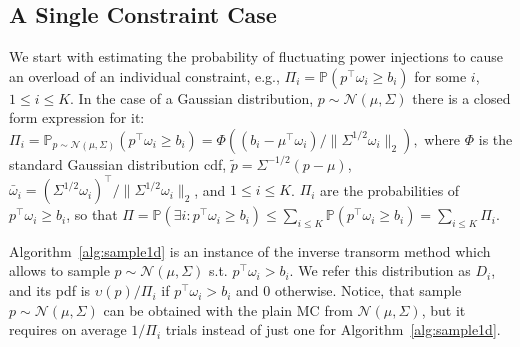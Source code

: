 \subsection{A Single Constraint Case}
We start with estimating the probability of fluctuating power injections to cause an overload of an individual constraint, e.g., $\Pi_i = \mathbb{P}(p^\top \omega_i \ge b_i)$ for some $i$, $1\le i \le K$. In the case of a Gaussian distribution, $p\sim \mathcal{N}(\mu,\Sigma)$ there is a closed form expression for it:
$%
\Pi_i  = \mathbb{P}_{p\sim \mathcal{N}(\mu, \Sigma)}(p^\top \omega_i \ge b_i) %
 = \Phi((b_i - \mu^\top \omega_i)/\|\Sigma^{1/2}\omega_i\|_2), 
$%
where $\Phi$ is the standard Gaussian distribution cdf, ${\tilde p} = \Sigma^{-1/2}(p-\mu)$, ${\bar\omega}_i = (\Sigma^{1/2}\omega_i)^\top/\|\Sigma^{1/2}\omega_i\|_2$, and $1\le i \le K$. $\Pi_i$ are the probabilities of $p^\top \omega_i \ge b_i$, so that 
$
    \Pi = \mathbb{P}(\exists i: p^\top \omega_i \ge b_i) \le \sum_{i\le K}\mathbb{P}(p^\top \omega_i \ge b_i) = \sum_{i\le K} \Pi_i.
$

Algorithm~\ref{alg:sample1d} is an instance of the inverse transorm method \cite{l2009monte} which allows to sample $p \sim \mathcal{N}(\mu, \Sigma)$ s.t. $p^\top \omega_i > b_i$. We refer this distribution as $D_i$, and its pdf is $\upsilon(p)/\Pi_i$ if $p^\top \omega_i > b_i$ and $0$ otherwise. Notice, that sample $p \sim \mathcal{N}(\mu, \Sigma)$ can be obtained with the plain MC from $\mathcal{N}(\mu, \Sigma)$, but it requires on average $1/\Pi_i$ trials instead of just one for Algorithm~\ref{alg:sample1d}.

